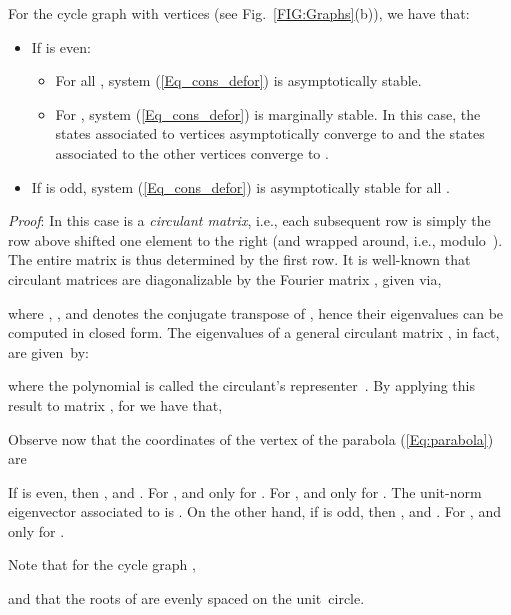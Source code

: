 \documentclass[letterpaper,9pt,twocolumn]{autart}
\begin{document}
\begin{proposition}\label{Prop_Cycle}
For the cycle graph  with  vertices (see Fig.~\ref{FIG:Graphs}(b)), we have that:
\begin{itemize}
\item If  is even:
\begin{itemize}
\item For all , system (\ref{Eq_cons_defor}) is asymptotically stable.
\item For , system (\ref{Eq_cons_defor}) is marginally stable.
In this case, the states associated to  vertices asymptotically
converge to 
and the states associated to the other  vertices converge to .
\end{itemize}
\item If  is odd, system (\ref{Eq_cons_defor}) is asymptotically stable for all .
\end{itemize}
\emph{Proof}:
In this case  is a \emph{circulant matrix}, 
i.e., each subsequent row is simply the row above shifted one element
to the right (and wrapped around, i.e., modulo~). The entire matrix is thus determined by the first row.
It is well-known that circulant matrices are diagonalizable by the Fourier matrix , given via,

where , , and 
denotes the conjugate transpose of ,
hence their eigenvalues can be computed in closed form.
The eigenvalues of a general  circulant matrix
, in fact,
are given~by:

where the polynomial 
is called the circulant's representer~\cite[Th. 3.2.2]{Davis_book94}.
By applying this result to matrix , for  we have that,

Observe now that the coordinates of the vertex of the
parabola (\ref{Eq:parabola}) are

If  is even, then , 
and . For , 
and  only for .
For , 
and  only for .
The unit-norm eigenvector associated to  is
.
On the other hand, if  is odd, then ,
 and . For ,
 and  only for .
\hfill
\end{proposition}
Note that for the cycle graph ,

and that the  roots of  are evenly spaced on the
unit~circle. 
\end{document}
